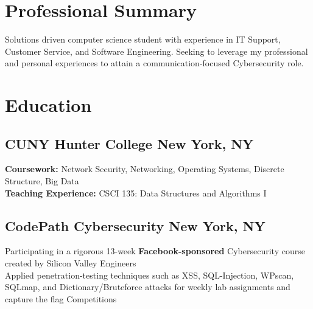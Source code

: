 \documentclass[a4paper]{Resume}
\begin{document}


\descript{}
\begin{onehalfspace} 
\section{Professional Summary}
\hrulefill

Solutions driven computer science student with experience in IT Support, Customer Service, and Software Engineering. Seeking to leverage my professional and personal experiences to attain a communication-focused Cybersecurity role.   
\sectionsep

\section{Education}
\hrulefill

\subsection{CUNY Hunter College \hfill \normalfont New York, NY}



\pt \textbf{Coursework:} Network Security, Networking, Operating Systems, Discrete Structure, Big Data   \\
\pt \textbf{Teaching Experience:} CSCI 135: Data Structures and Algorithms I  
\sectionsep

\subsection{CodePath Cybersecurity \hfill \normalfont New York, NY}

\pt Participating in a rigorous 13-week \textbf{Facebook-sponsored} Cybersecurity course created by Silicon Valley Engineers  \\
\pt Applied penetration-testing techniques such as XSS, SQL-Injection, WPscan, SQLmap, and Dictionary/Bruteforce attacks for weekly lab assignments and capture the flag Competitions
\sectionsep




\end{onehalfspace}
\end{document}
